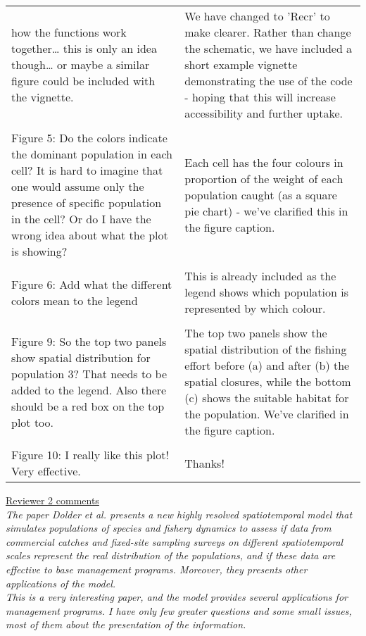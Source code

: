 \documentclass[10pt]{letter}
\begin{document}
\begin{landscape}
\begin{center}
\begin{longtable}{p{12cm} | p{12cm}}
how the functions work together… this is only an idea though… or maybe a
similar figure could be included with the vignette. & We have changed to 'Recr'
to make clearer. Rather than change the schematic, we have included a short
example vignette demonstrating the use of the code - hoping that this will
increase accessibility and further uptake. \\
\\
Figure 5: Do the colors indicate the dominant population in each cell? It is
hard to imagine that one would assume only the presence of specific population
in the cell? Or do I have the wrong idea about what the plot is showing? & Each
cell has the four colours in proportion of the weight of each population caught
(as a square pie chart) - we've clarified this in the figure caption. \\
\\
Figure 6: Add what the different colors mean to the legend & This is already
included as the legend shows which population is represented by which colour. \\
\\
Figure 9: So the top two panels show spatial distribution for population 3?
That needs to be added to the legend. Also there should be a red box on the top
plot too. & The top two panels show the spatial distribution of the fishing
effort before (a) and after (b) the spatial closures, while the bottom (c)
shows the suitable habitat for the population. We've clarified in the figure
caption. \\
\\
Figure 10: I really like this plot! Very effective. & Thanks! \\
		\bottomrule
	\end{longtable}

\end{center}

\underline{Reviewer 2 comments} \\

\textit{The paper Dolder et al. presents a new highly resolved spatiotemporal
	model that simulates populations of species and fishery dynamics to
	assess if data from commercial catches and fixed-site sampling surveys
	on different spatiotemporal scales represent the real distribution of
	the populations, and if these data are effective to base  management
	programs. Moreover, they presents other applications of the model.} \\

\textit{This is a very interesting paper, and the model provides several
	applications for management programs. I have only few greater questions
	and some small issues, most of them about the presentation of the
	information.}  \\


\end{landscape}
\end{document}
